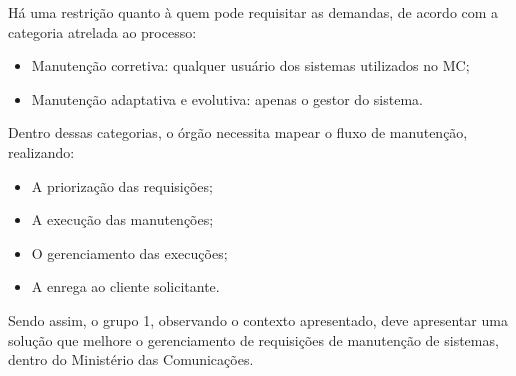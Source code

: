 Há uma restrição quanto à quem pode requisitar as demandas, de acordo com a categoria atrelada ao processo:
\begin{itemize}
  \item Manutenção corretiva: qualquer usuário dos sistemas utilizados no MC;
  \item Manutenção adaptativa e evolutiva: apenas o gestor do sistema.
\end{itemize}

Dentro dessas categorias, o órgão necessita mapear o fluxo de manutenção, realizando:
\begin{itemize}
  \item A priorização das requisições;
  \item A execução das manutenções;
  \item O gerenciamento das execuções;
  \item A enrega ao cliente solicitante.
\end{itemize}

Sendo assim, o grupo 1, observando o contexto apresentado, deve apresentar uma solução que melhore o gerenciamento de requisições de manutenção de sistemas, dentro do Ministério das Comunicações.
